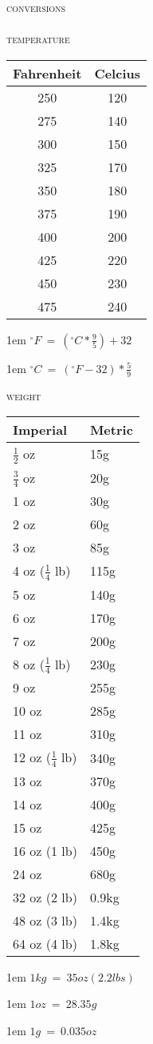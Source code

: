 \documentclass[letterpaper,11pt]{article}
\newcommand{\sectionheader}[1]
{
  \vspace{0.5em}
  {\small\textsc{#1}} \\
  \vspace{1em}
}%
\newcommand{\note}[1]
{
  \small
  \begin{addmargin}{1em}
    #1
  \end{addmargin}
}%
\begin{document}
\normalsize

\pagestyle{empty}
{\huge\scshape{conversions}} \\
~ \\

\sectionheader{temperature}
\begin{tabular}{ c c }
\rowcolor{white}
Fahrenheit & Celcius \\
\hline
\rowcolor{red!5}
250 & 120 \\
\rowcolor{red!10}
275 & 140 \\
\rowcolor{red!15}
300 & 150 \\
\rowcolor{red!20}
325 & 170 \\
\rowcolor{red!25}
350 & 180 \\
\rowcolor{red!30}
375 & 190 \\
\rowcolor{red!35}
400 & 200 \\
\rowcolor{red!40}
425 & 220 \\
\rowcolor{red!45}
450 & 230 \\
\rowcolor{red!50}
475 & 240 \\
\end{tabular}%

\note{ $ ^{\circ}F ~=~ (^{\circ}C * \frac{9}{5}) + 32 $ }
\note{ $ ^{\circ}C ~=~ (^{\circ}F - 32) * \frac{5}{9} $ }

\sectionheader{weight}
\begin{tabular}{ l l }
\rowcolor{white}
Imperial & Metric \\
\hline
$\frac{1}{2}$ oz & 15g \\
$\frac{3}{4}$ oz & 20g \\
1 oz & 30g \\
2 oz & 60g \\
3 oz & 85g \\
4 oz ($\frac{1}{4}$ lb) & 115g \\
5 oz & 140g \\
6 oz & 170g \\
7 oz & 200g \\
8 oz ($\frac{1}{4}$ lb) & 230g \\
9 oz & 255g \\
10 oz & 285g \\
11 oz & 310g \\
12 oz ($\frac{1}{4}$ lb) & 340g \\
13 oz & 370g \\
14 oz & 400g \\
15 oz & 425g \\
16 oz (1 lb) & 450g \\
24 oz & 680g \\
32 oz (2 lb) & 0.9kg \\
48 oz (3 lb) & 1.4kg \\
64 oz (4 lb) & 1.8kg \\
\end{tabular}%

\note{ $ 1kg ~=~ 35oz (2.2lbs) $ }
\note{ $ 1oz ~=~ 28.35g $ }
\note{ $ 1g ~=~ 0.035oz $ }
\end{document}
